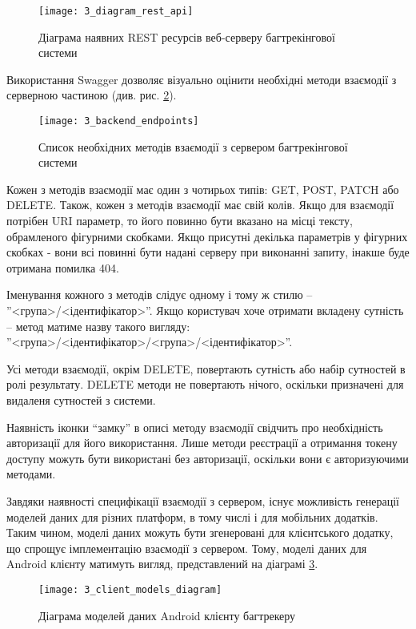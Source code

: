 \documentclass[../main.tex]{subfiles}
\begin{document}
		\begin{figure}[H]
			\centering
			\texttt{[image: 3\_diagram\_rest\_api]}
			\caption{Діаграма наявних REST ресурсів веб-серверу багтрекінгової системи}
			\label{available_rest_resources}
		\end{figure}
		
		Використання Swagger дозволяє візуально оцінити необхідні методи взаємодії з серверною частиною (див. рис. \ref{available_rest_endpoints}).
		
		\begin{figure}[H]
			\centering
			\texttt{[image: 3\_backend\_endpoints]}
			\caption{Список необхідних методів взаємодії з сервером багтрекінгової системи}
			\label{available_rest_endpoints}
		\end{figure}
		
		Кожен з методів взаємодії має один з чотирьох типів: GET, POST, PATCH або DELETE. Також, кожен з методів взаємодії має свій колів. Якщо для взаємодії потрібен URI параметр, то його повинно бути вказано на місці тексту, обрамленого фігурними скобками. Якщо присутні декілька параметрів у фігурних скобках - вони всі повинні бути надані серверу при виконанні запиту, інакше буде отримана помилка 404.
		
		Іменування кожного з методів слідує одному і тому ж стилю -- ''<група>/<ідентифікатор>''. Якщо користувач хоче отримати вкладену сутність -- метод матиме назву такого вигляду: ''<група>/<ідентифікатор>/<група>/<ідентифікатор>''.
		
		Усі методи взаємодії, окрім DELETE, повертають сутність або набір сутностей в ролі результату. DELETE методи не повертають нічого, оскільки призначені для видаленя сутностей з системи.
		
		Наявність іконки \enquote{замку} в описі методу взаємодії свідчить про необхідність авторизації для його використання. Лише методи реєстрації а отримання токену доступу можуть бути використані без авторизації, оскільки вони є авторизуючими методами.
		
		Завдяки наявності специфікації взаємодії з сервером, існує можливість генерації моделей даних для різних платформ, в тому числі і для мобільних додатків. Таким чином, моделі даних можуть бути згенеровані для клієнтського додатку, що спрощує імплементацію взаємодії з сервером. Тому, моделі даних для Android клієнту матимуть вигляд, представлений на діаграмі \ref{client_models}.
		
		\begin{figure}[H]
			\centering
			\texttt{[image: 3\_client\_models\_diagram]}
			\caption{Діаграма моделей даних Android клієнту багтрекеру}
			\label{client_models}
		\end{figure}
		
\end{document}
